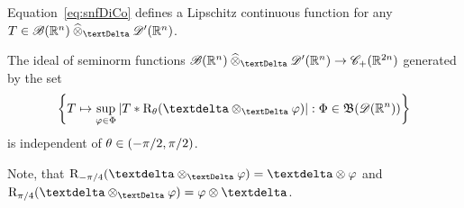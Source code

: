 \begin{lemma}
    Equation~\eqref{eq:snfDiCo} defines a Lipschitz continuous function
    for any $ T \in \fsSmobnd(\nrR^n) \cteproDi \fsDis(\nrR^n) $.
\end{lemma}

\begin{lemma}
    The ideal of seminorm functions
    $ \fsSmobnd( \nrR^n ) \cteproDi \fsDis( \nrR^n ) \to \fsCntp( \nrR^{2n} ) $
    generated by the set
    \begin{align}
        \BrmSet{ T \mto \sup_{\ph\in\Ph}\Abs{ T * \rmR_\th( \sfdeo \teproDi \ph ) } }
        { \Ph \in \ssBnd( \fsTest( \nrR^n ) ) }
    \end{align}
    is independent of $ \theta \in (-\pi/2,\pi/2) $.
\end{lemma}

\begin{remark}
    Note, that $ \rmR_{-\pi/4}( \sfdeo \teproDi \ph ) = \sfdeo \tepro \ph $
    and $ \rmR_{\pi/4}( \sfdeo \teproDi \ph ) = \ph \tepro \sfdeo $.
\end{remark}